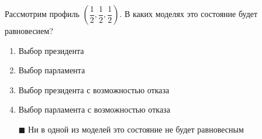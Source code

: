Рассмотрим профиль $\left(\dfrac{1}{2}, \dfrac{1}{2}, \dfrac{1}{2}\right)$. В каких моделях это состояние будет равновесием?
\begin{enumerate}[label=$\square$]
	
	
	
	
	\item Выбор президента %
	\item Выбор парламента
	\item Выбор президента с возможностью отказа
	\item Выбор парламента с возможностью отказа
	\item[$\blacksquare$] Ни в одной из моделей это состояние не будет равновесным
\end{enumerate}


